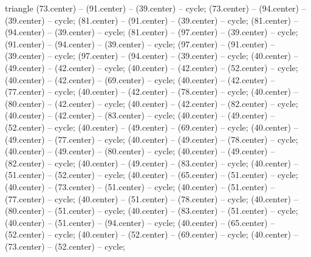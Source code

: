 \begin{pgfonlayer}{triangle}
 (73.center) -- (91.center) -- (39.center) -- cycle; 
 (73.center) -- (94.center) -- (39.center) -- cycle; 
 (81.center) -- (91.center) -- (39.center) -- cycle; 
 (81.center) -- (94.center) -- (39.center) -- cycle; 
 (81.center) -- (97.center) -- (39.center) -- cycle; 
 (91.center) -- (94.center) -- (39.center) -- cycle; 
 (97.center) -- (91.center) -- (39.center) -- cycle; 
 (97.center) -- (94.center) -- (39.center) -- cycle; 
 (40.center) -- (49.center) -- (42.center) -- cycle; 
 (40.center) -- (42.center) -- (52.center) -- cycle; 
 (40.center) -- (42.center) -- (69.center) -- cycle; 
 (40.center) -- (42.center) -- (77.center) -- cycle; 
 (40.center) -- (42.center) -- (78.center) -- cycle; 
 (40.center) -- (80.center) -- (42.center) -- cycle; 
 (40.center) -- (42.center) -- (82.center) -- cycle; 
 (40.center) -- (42.center) -- (83.center) -- cycle; 
 (40.center) -- (49.center) -- (52.center) -- cycle; 
 (40.center) -- (49.center) -- (69.center) -- cycle; 
 (40.center) -- (49.center) -- (77.center) -- cycle; 
 (40.center) -- (49.center) -- (78.center) -- cycle; 
 (40.center) -- (49.center) -- (80.center) -- cycle; 
 (40.center) -- (49.center) -- (82.center) -- cycle; 
 (40.center) -- (49.center) -- (83.center) -- cycle; 
 (40.center) -- (51.center) -- (52.center) -- cycle; 
 (40.center) -- (65.center) -- (51.center) -- cycle; 
 (40.center) -- (73.center) -- (51.center) -- cycle; 
 (40.center) -- (51.center) -- (77.center) -- cycle; 
 (40.center) -- (51.center) -- (78.center) -- cycle; 
 (40.center) -- (80.center) -- (51.center) -- cycle; 
 (40.center) -- (83.center) -- (51.center) -- cycle; 
 (40.center) -- (51.center) -- (94.center) -- cycle; 
 (40.center) -- (65.center) -- (52.center) -- cycle; 
 (40.center) -- (52.center) -- (69.center) -- cycle; 
 (40.center) -- (73.center) -- (52.center) -- cycle; 

\end{pgfonlayer}
